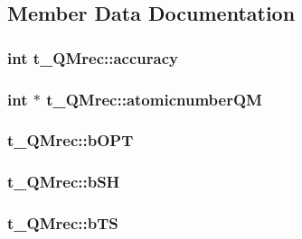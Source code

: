 \subsection{\-Member \-Data \-Documentation}
\hypertarget{structt__QMrec_a431537349b911462ca1293d1b2e59e55}{
\subsubsection[{accuracy}]{\setlength{\rightskip}{0pt plus 5cm}int {\bf t\-\_\-\-Q\-Mrec\-::accuracy}}}\label{structt__QMrec_a431537349b911462ca1293d1b2e59e55}
\hypertarget{structt__QMrec_a2e82cdbb0c311920281f4bed5d11da7c}{
\subsubsection[{atomicnumber\-Q\-M}]{\setlength{\rightskip}{0pt plus 5cm}int $\ast$ {\bf t\-\_\-\-Q\-Mrec\-::atomicnumber\-Q\-M}}}\label{structt__QMrec_a2e82cdbb0c311920281f4bed5d11da7c}
\hypertarget{structt__QMrec_a5834d470041a8803124b5caa48f48db6}{
\subsubsection[{b\-O\-P\-T}]{ {\bf t\-\_\-\-Q\-Mrec\-::b\-O\-P\-T}}}\label{structt__QMrec_a5834d470041a8803124b5caa48f48db6}
\hypertarget{structt__QMrec_ae8c61908c948f2fa5eac0730685b884c}{
\subsubsection[{b\-S\-H}]{ {\bf t\-\_\-\-Q\-Mrec\-::b\-S\-H}}}\label{structt__QMrec_ae8c61908c948f2fa5eac0730685b884c}
\hypertarget{structt__QMrec_ac0fdedfe5bc2ff2a89f8aa58978c4309}{
\subsubsection[{b\-T\-S}]{ {\bf t\-\_\-\-Q\-Mrec\-::b\-T\-S}}}\label{structt__QMrec_ac0fdedfe5bc2ff2a89f8aa58978c4309}
